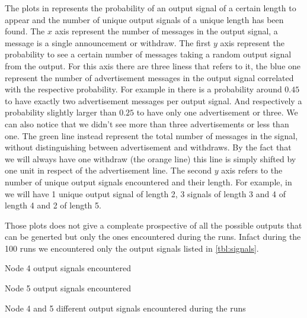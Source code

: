 The plots in  represents the probability of an
output signal of a certain length to appear and the number of unique output signals
of a unique length has been found.
The $x$ axis represent the number of messages in the output signal, a message
is a single announcement or withdraw.
The first $y$ axis represent the probability to see a certain number of messages
taking a random output signal from the output.
For this axis there are three liness that refers to it, the blue one represent the
number of advertisement messages in the output signal correlated with the 
respective probability.
For example in  there is a probability around $0.45$ to have
exactly two advertisement messages per output signal. And respectively a probability
slightly larger than $0.25$ to have only one advertisement or three.
We can also notice that we didn't see more than three advertisements or less than one.
The green line instead represent the total number of messages in the signal,
without distinguishing between advertisement and withdraws.
By the fact that we will always have one withdraw (the orange line) this line 
is simply shifted by one unit in respect of the advertisement line.
The second $y$ axis refers to the number of unique output signals encountered and
their length.
For example, in  we will have \num{1} unique output signal
of length \num{2}, \num{3} signals of length \num{3} and \num{4} of length \num{4} and \num{2} of length \num{5}.

Those plots does not give a compleate prospective of all the possible outputs
that can be generted but only the ones encountered during the runs.
Infact during the \num{100} runs we encountered only the output signals listed
in \cref{tbl:signals}.

\begin{table}[h]
	\begin{subtable}[h]{0.45\textwidth}
		
		\caption{Node \num{4} output signals encountered}
		\label{tab:node4_outSignals}
    \end{subtable}
	\hfill
	\begin{subtable}[h]{0.45\textwidth}
		
		\caption{Node \num{5} output signals encountered}
		\label{tab:node5_outSignals}
    \end{subtable}
	\caption{Node 4 and 5 different output signals encountered during the runs}
	\label{tbl:signals}
\end{table}


